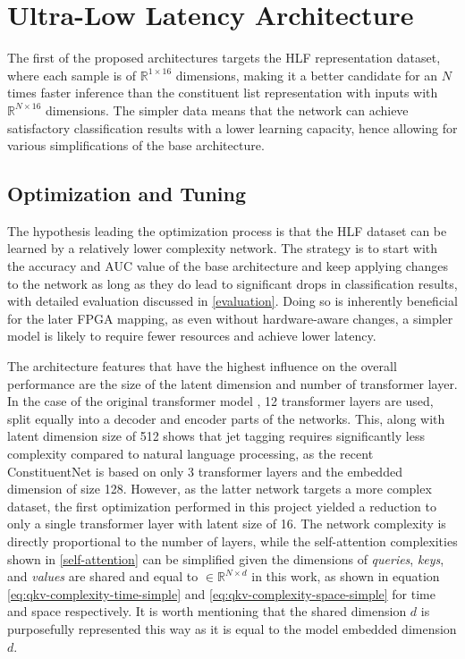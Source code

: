 \section{Ultra-Low Latency Architecture}
The first of the proposed architectures targets the HLF representation dataset, where each sample is of \(\mathbb{R}^{1 \times 16}\) dimensions, making it a better candidate for an \(N\) times faster inference than the constituent list representation with inputs with \(\mathbb{R}^{N \times 16}\) dimensions. The simpler data means that the network can achieve satisfactory classification results with a lower learning capacity, hence allowing for various simplifications of the base architecture.

\subsection{Optimization and Tuning}
The hypothesis leading the optimization process is that the HLF dataset can be learned by a relatively lower complexity network. The strategy is to start with the accuracy and AUC value of the base architecture and keep applying changes to the network as long as they do lead to significant drops in classification results, with detailed evaluation discussed in 
\cref{evaluation}. Doing so is inherently beneficial for the later FPGA mapping, as even without hardware-aware changes, a simpler model is likely to require fewer resources and achieve lower latency.

The architecture features that have the highest influence on the overall performance are the size of the latent dimension and number of transformer layer. In the case of the original transformer model \cite{44-vaswani2017attention}, 12 transformer layers are used, split equally into a decoder and encoder parts of the networks. This, along with latent dimension size of 512 shows that jet tagging requires significantly less complexity compared to natural language processing, as the recent ConstituentNet \cite{3-yuan2021msc} is based on only 3 transformer layers and the embedded dimension of size 128. However, as the latter network targets a more complex dataset, the first optimization performed in this project yielded a reduction to only a single transformer layer with latent size of 16. The network complexity is directly proportional to the number of layers, while the self-attention complexities shown in \cref{self-attention} can be simplified given the dimensions of \textit{queries}, \textit{keys}, and \textit{values} are shared and equal to \(\in \mathbb{R}^{N \times d}\) in this work, 
as shown in equation \ref{eq:qkv-complexity-time-simple} and \ref{eq:qkv-complexity-space-simple} for time and space respectively. It is worth mentioning that the shared dimension \(d\) is purposefully represented this way as it is equal to the model embedded dimension \(d\).

